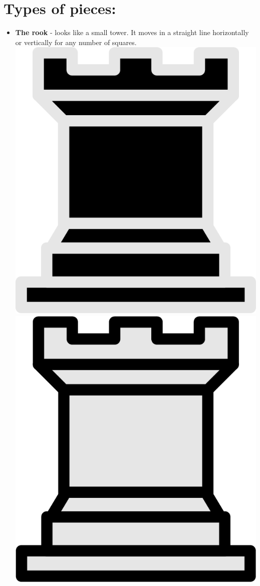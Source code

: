 \documentclass{article}
\begin{document}
\section{Types of pieces:}

\begin{itemize}
    \item \textbf{The rook} - looks like a small tower. It moves in a straight line horizontally or vertically for any number of squares. \\
    \includegraphics[scale=0.1]{image3.png}
    \includegraphics[scale=0.1]{image7.png}
    

\end{itemize}
\end{document}
